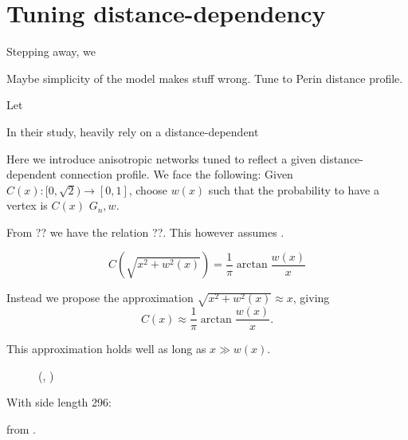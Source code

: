 
\section{Tuning distance-dependency}

Stepping away, we 




Maybe simplicity of the model makes stuff wrong. Tune to Perin
distance profile.

Let 

In their study, \textcite{Perin2011} heavily rely on a
distance-dependent 


Here we introduce anisotropic networks tuned to reflect a given
distance-dependent connection profile. We face the following: Given
$C(x):[0,\sqrt{2}) \to [0,1]$, choose $w(x)$ such that the probability
to have a vertex is $C(x)$ $G_n,w$.

From ?? we have the relation ??. This however assumes . 

\[
C\left(\sqrt{x^2+w^2(x)}\right) = \frac{1}{\pi} \operatorname{arctan}
\frac{w(x)}{x}
\] 



Instead we propose the approximation $\sqrt{x^2 + w^2(x)} \approx  x$,
giving
\[
C(x) \approx \frac{1}{\pi} \operatorname{arctan} \label{eq:tanapprox}
\frac{w(x)}{x}.
\] 

This approximation holds well as long as $x \gg w(x)$.

  




\begin{figure}[htp]
  \centering
  \vspace{-0.15cm}
  \caption{ (, )} %
  \label{fig:determine_side_length}
\end{figure}

With side length 296:


from .


